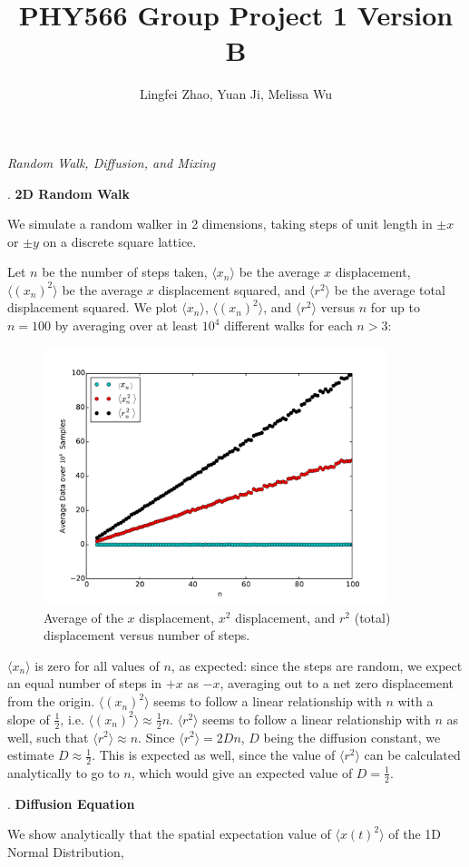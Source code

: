 \documentclass{article}
\begin{document}
\title{PHY566 Group Project 1 Version B}
\author{Lingfei Zhao, Yuan Ji, Melissa Wu}
\maketitle

\begin{center}
\textit{\large Random Walk, Diffusion, and Mixing}\par
\end{center}
. \textbf{2D Random Walk}\par
\smallskip
We simulate a random walker in 2 dimensions, taking steps of unit length in $\pm x$ or $\pm y$ on a discrete square lattice.\par
Let $n$ be the number of steps taken, $\langle x_{n} \rangle$ be the average $x$ displacement, $\langle (x_{n})^{2} \rangle$ be the average $x$ displacement squared, and $\langle r^{2} \rangle$ be the average total displacement squared. We plot $\langle x_{n} \rangle$, $\langle (x_{n})^{2} \rangle$, and $\langle r^{2} \rangle$ versus $n$ for up to $n = 100$ by averaging over at least $10^{4}$ different walks for each $n > 3$:\par
\begin{figure}[H]
\centering
\includegraphics[width=10cm]{average.pdf}
\caption{Average of the $x$ displacement, $x^{2}$ displacement, and $r^{2}$ (total) displacement versus number of steps.}
\end{figure}
$\langle x_{n} \rangle$ is zero for all values of $n$, as expected: since the steps are random, we expect an equal number of steps in $+x$ as $-x$, averaging out to a net zero displacement from the origin. $\langle(x_{n})^{2} \rangle$ seems to follow a linear relationship with $n$ with a slope of $\frac{1}{2}$, i.e. $\langle(x_{n})^{2} \rangle \approx \frac{1}{2}n$. $\langle r^{2} \rangle$ seems to follow a linear relationship with $n$ as well, such that $\langle r^{2} \rangle \approx n$. Since $\langle r^{2} \rangle = 2Dn$, $D$ being the diffusion constant, we estimate $D \approx \frac{1}{2}$. This is expected as well, since the value of $\langle r^{2} \rangle$ can be calculated analytically to go to $n$, which would give an expected value of $D = \frac{1}{2}$.\par
\bigskip
{}. \textbf{Diffusion Equation}\par
\smallskip
We show analytically that the spatial expectation value of $\langle x(t)^{2} \rangle$ of the 1D Normal Distribution,
\end{document}
